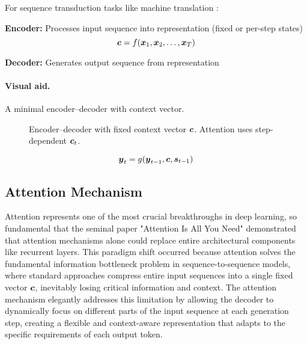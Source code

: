 For sequence transduction tasks like machine translation \cite{Cho2014,Bahdanau2014}:

\textbf{Encoder:} Processes input sequence into representation (fixed or per-step states)
\begin{equation}
\boldsymbol{c} = f(\boldsymbol{x}_1, \boldsymbol{x}_2, \ldots, \boldsymbol{x}_T)
\end{equation}

\textbf{Decoder:} Generates output sequence from representation
\paragraph{Visual aid.} A minimal encoder–decoder with context vector.
\begin{figure}[h]
    \centering
    \caption{Encoder–decoder with fixed context vector $\boldsymbol{c}$. Attention uses step-dependent $\boldsymbol{c}_t$.}
\end{figure}

\begin{equation}
\boldsymbol{y}_t = g(\boldsymbol{y}_{t-1}, \boldsymbol{c}, \boldsymbol{s}_{t-1})
\end{equation}

\subsection{Attention Mechanism}

Attention represents one of the most crucial breakthroughs in deep learning, so fundamental that the seminal paper "Attention Is All You Need" \cite{Vaswani2017} demonstrated that attention mechanisms alone could replace entire architectural components like recurrent layers. This paradigm shift occurred because attention solves the fundamental information bottleneck problem in sequence-to-sequence models, where standard approaches compress entire input sequences into a single fixed vector $\boldsymbol{c}$, inevitably losing critical information and context. The attention mechanism elegantly addresses this limitation by allowing the decoder to dynamically focus on different parts of the input sequence at each generation step, creating a flexible and context-aware representation that adapts to the specific requirements of each output token.


